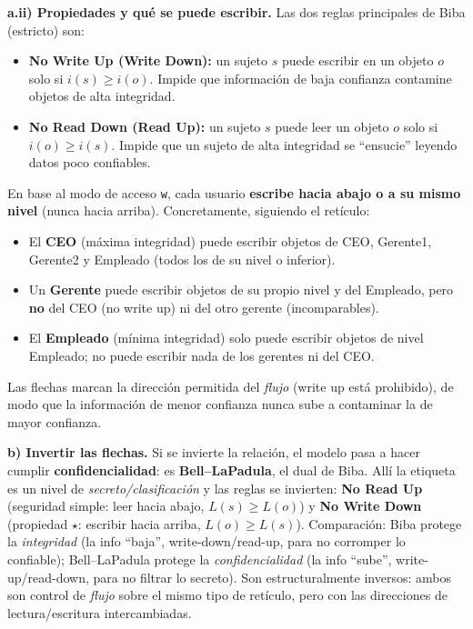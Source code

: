 \medskip
\textbf{a.ii) Propiedades y qué se puede escribir.} Las dos reglas principales de Biba
(estricto) son:
\begin{itemize}[leftmargin=1.4em,itemsep=2pt]
  \item \textbf{No Write Up (Write Down):} un sujeto $s$ puede escribir en un objeto $o$ solo
        si $i(s) \ge i(o)$. Impide que información de baja confianza contamine objetos de alta
        integridad.
  \item \textbf{No Read Down (Read Up):} un sujeto $s$ puede leer un objeto $o$ solo si
        $i(o) \ge i(s)$. Impide que un sujeto de alta integridad se ``ensucie'' leyendo datos
        poco confiables.
\end{itemize}
En base al modo de acceso \texttt{w}, cada usuario \textbf{escribe hacia abajo o a su mismo
nivel} (nunca hacia arriba). Concretamente, siguiendo el retículo:
\begin{itemize}[leftmargin=1.4em,itemsep=1pt]
  \item El \textbf{CEO} (máxima integridad) puede escribir objetos de CEO, Gerente1, Gerente2 y
        Empleado (todos los de su nivel o inferior).
  \item Un \textbf{Gerente} puede escribir objetos de su propio nivel y del Empleado, pero
        \textbf{no} del CEO (no write up) ni del otro gerente (incomparables).
  \item El \textbf{Empleado} (mínima integridad) solo puede escribir objetos de nivel Empleado;
        no puede escribir nada de los gerentes ni del CEO.
\end{itemize}
Las flechas marcan la dirección permitida del \emph{flujo} (write up está prohibido), de modo
que la información de menor confianza nunca sube a contaminar la de mayor confianza.

\medskip
\textbf{b) Invertir las flechas.} Si se invierte la relación, el modelo pasa a hacer cumplir
\textbf{confidencialidad}: es \textbf{Bell--LaPadula}, el dual de Biba. Allí la etiqueta es un
nivel de \emph{secreto/clasificación} y las reglas se invierten: \textbf{No Read Up} (seguridad
simple: leer hacia abajo, $L(s)\ge L(o)$) y \textbf{No Write Down} (propiedad $\star$: escribir
hacia arriba, $L(o)\ge L(s)$). Comparación: Biba protege la \emph{integridad} (la info ``baja'',
write-down/read-up, para no corromper lo confiable); Bell--LaPadula protege la
\emph{confidencialidad} (la info ``sube'', write-up/read-down, para no filtrar lo secreto). Son
estructuralmente inversos: ambos son control de \emph{flujo} sobre el mismo tipo de retículo,
pero con las direcciones de lectura/escritura intercambiadas.

